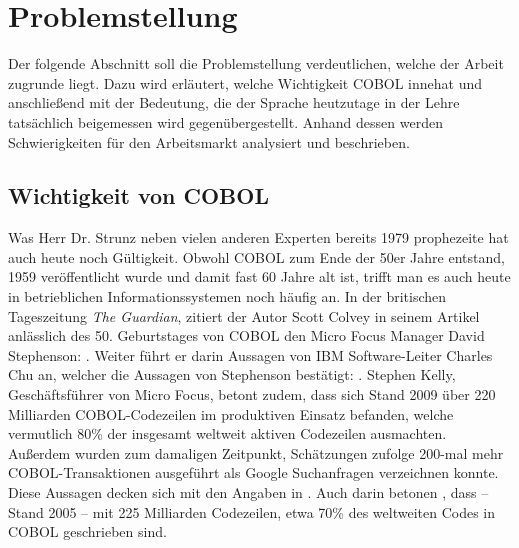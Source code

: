 \section{Problemstellung}\label{problemstellung}
Der folgende Abschnitt soll die Problemstellung verdeutlichen, welche der Arbeit zugrunde liegt. 
Dazu wird erläutert, welche Wichtigkeit COBOL innehat und anschließend mit der Bedeutung, die der Sprache heutzutage in der Lehre tatsächlich beigemessen wird gegenübergestellt. Anhand dessen werden Schwierigkeiten für den Arbeitsmarkt analysiert und beschrieben.

\subsection*{Wichtigkeit von COBOL}\label{wichtigkeit}
 \cite{_ist_1979}

Was Herr Dr. Strunz neben vielen anderen Experten bereits 1979 prophezeite hat auch heute noch Gültigkeit. Obwohl COBOL zum Ende der 50er Jahre entstand, 1959 veröffentlicht wurde und damit fast 60 Jahre alt ist, trifft man es auch heute in betrieblichen Informationssystemen noch häufig an. In der britischen Tageszeitung \textit{The Guardian}, zitiert der Autor Scott Colvey in seinem Artikel \cite{colvey_cobol_2009} anlässlich des 50. Geburtstages von COBOL den Micro Focus Manager David Stephenson: . Weiter führt er darin Aussagen von IBM Software-Leiter Charles Chu an, welcher die Aussagen von Stephenson bestätigt: . Stephen Kelly, Geschäftsführer von Micro Focus, betont zudem, dass sich Stand 2009 über 220 Milliarden COBOL-Codezeilen im produktiven Einsatz befanden, welche vermutlich 80\% der insgesamt weltweit aktiven Codezeilen ausmachten. Außerdem wurden zum damaligen Zeitpunkt, Schätzungen zufolge 200-mal mehr COBOL-Transaktionen ausgeführt als Google Suchanfragen verzeichnen konnte. \cite{kelly_cobol_2009} Diese Aussagen decken sich mit den Angaben in . Auch darin betonen \citeauthor{doke_cobol_2005}, dass -- Stand 2005 -- mit 225 Milliarden Codezeilen, etwa 70\% des weltweiten Codes in COBOL geschrieben sind.

